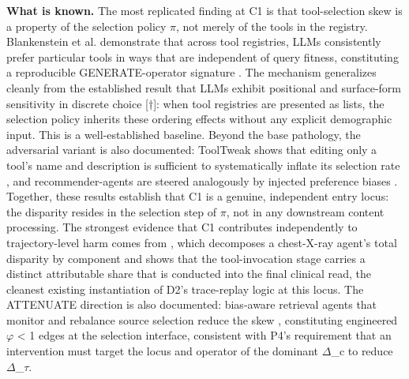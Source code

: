 \documentclass[10pt]{article}
\begin{document}
\textbf{What is known.} The most replicated finding at C1 is that tool-selection skew is a property of the selection policy $\pi$, not merely of the tools in the registry. Blankenstein et al. demonstrate that across tool registries, LLMs consistently prefer particular tools in ways that are independent of query fitness, constituting a reproducible GENERATE-operator signature \cite{blankenstein2025biasbusters}. The mechanism generalizes cleanly from the established result that LLMs exhibit positional and surface-form sensitivity in discrete choice \cite{pezeshkpour2023large}[$\dagger$]: when tool registries are presented as lists, the selection policy inherits these ordering effects without any explicit demographic input. This is a well-established baseline. Beyond the base pathology, the adversarial variant is also documented: ToolTweak shows that editing only a tool's name and description is sufficient to systematically inflate its selection rate \cite{sneh2025tooltweak}, and recommender-agents are steered analogously by injected preference biases \cite{tang2026your}. Together, these results establish that C1 is a genuine, independent entry locus: the disparity resides in the selection step of $\pi$, not in any downstream content processing. The strongest evidence that C1 contributes independently to trajectory-level harm comes from \cite{xu2026ducx}, which decomposes a chest-X-ray agent's total disparity by component and shows that the tool-invocation stage carries a distinct attributable share that is conducted into the final clinical read, the cleanest existing instantiation of D2's trace-replay logic at this locus. The ATTENUATE direction is also documented: bias-aware retrieval agents that monitor and rebalance source selection reduce the skew \cite{singh2025bias,singh2025biasb}, constituting engineered $\varphi$ < 1 edges at the selection interface, consistent with P4's requirement that an intervention must target the locus and operator of the dominant $\Delta$\_c to reduce $\Delta$\_$\tau$.
\end{document}
